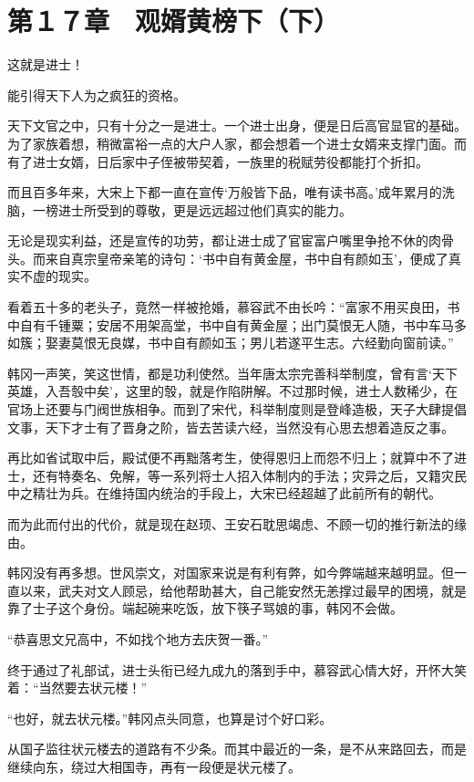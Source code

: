 \section{第１７章　观婿黄榜下（下）}

这就是进士！

能引得天下人为之疯狂的资格。

天下文官之中，只有十分之一是进士。一个进士出身，便是日后高官显官的基础。为了家族着想，稍微富裕一点的大户人家，都会想着一个进士女婿来支撑门面。而有了进士女婿，日后家中子侄被带契着，一族里的税赋劳役都能打个折扣。

而且百多年来，大宋上下都一直在宣传‘万般皆下品，唯有读书高。’成年累月的洗脑，一榜进士所受到的尊敬，更是远远超过他们真实的能力。

无论是现实利益，还是宣传的功劳，都让进士成了官宦富户嘴里争抢不休的肉骨头。而来自真宗皇帝亲笔的诗句：‘书中自有黄金屋，书中自有颜如玉’，便成了真实不虚的现实。

看着五十多的老头子，竟然一样被抢婚，慕容武不由长吟：“富家不用买良田，书中自有千锺粟；安居不用架高堂，书中自有黄金屋；出门莫恨无人随，书中车马多如簇；娶妻莫恨无良媒，书中自有颜如玉；男儿若遂平生志。六经勤向窗前读。”

韩冈一声笑，笑这世情，都是功利使然。当年唐太宗完善科举制度，曾有言‘天下英雄，入吾彀中矣’，这里的彀，就是作陷阱解。不过那时候，进士人数稀少，在官场上还要与门阀世族相争。而到了宋代，科举制度则是登峰造极，天子大肆提倡文事，天下才士有了晋身之阶，皆去苦读六经，当然没有心思去想着造反之事。

再比如省试取中后，殿试便不再黜落考生，使得恩归上而怨不归上；就算中不了进士，还有特奏名、免解，等一系列将士人招入体制内的手法；灾异之后，又籍灾民中之精壮为兵。在维持国内统治的手段上，大宋已经超越了此前所有的朝代。

而为此而付出的代价，就是现在赵顼、王安石耽思竭虑、不顾一切的推行新法的缘由。

韩冈没有再多想。世风崇文，对国家来说是有利有弊，如今弊端越来越明显。但一直以来，武夫对文人顾忌，给他帮助甚大，自己能安然无恙撑过最早的困境，就是靠了士子这个身份。端起碗来吃饭，放下筷子骂娘的事，韩冈不会做。

“恭喜思文兄高中，不如找个地方去庆贺一番。”

终于通过了礼部试，进士头衔已经九成九的落到手中，慕容武心情大好，开怀大笑着：“当然要去状元楼！”

“也好，就去状元楼。”韩冈点头同意，也算是讨个好口彩。

从国子监往状元楼去的道路有不少条。而其中最近的一条，是不从来路回去，而是继续向东，绕过大相国寺，再有一段便是状元楼了。

